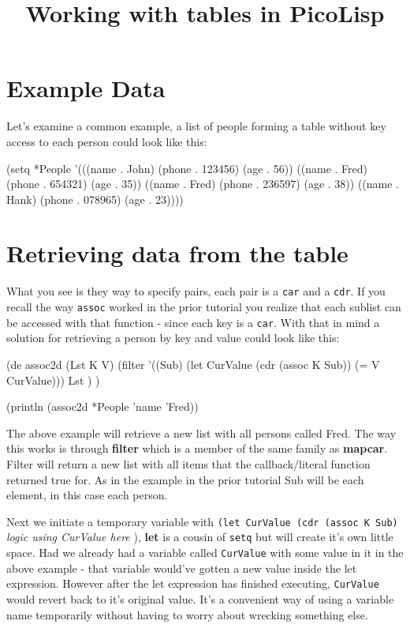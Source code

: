 \title{Working with tables in PicoLisp}

\maketitle

\section{Example Data}
\label{sec:work-with-tables-example-data}

Let's examine a common example, a list of people forming a table without
key access to each person could look like this:

\begin{wideverbatim}
(setq *People 
      '(((name . John) (phone . 123456) (age . 56))
        ((name . Fred) (phone . 654321) (age . 35))
        ((name . Fred) (phone . 236597) (age . 38))
        ((name . Hank) (phone . 078965) (age . 23))))
\end{wideverbatim}


\section{Retrieving data from the table}
\label{sec:work-with-tables-retrieving-data-from-the-table}


What you see is they way to specify pairs, each pair is a \texttt{car}
and a \texttt{cdr}. If you recall the way \texttt{assoc} worked in the
prior tutorial you realize that each sublist can be accessed with that
function - since each key is a \texttt{car}. With that in mind a solution for
retrieving a person by key and value could look like this:


\begin{wideverbatim}
(de assoc2d (Lst K V)
    (filter '((Sub)
              (let CurValue (cdr (assoc K Sub))
                (= V CurValue))) Lst ) )
                
(println (assoc2d *People 'name 'Fred))
\end{wideverbatim}

The above example will retrieve a new list with all persons called Fred.
The way this works is through \textbf{filter} which is a member of the same
family as \textbf{mapcar}. Filter will return a new list with all items that
the callback/literal function returned true for. As in the example in
the prior tutorial Sub will be each element, in this case each person.

Next we initiate a temporary variable with \texttt{(let CurValue (cdr
  (assoc K Sub)} \emph{logic using CurValue here} ), \textbf{let} is a
cousin of \texttt{setq} but will create it's own little space. Had we
already had a variable called \texttt{CurValue} with some value in it in the
above example - that variable would've gotten a new value inside the
let expression. However after the let expression has finished
executing, \texttt{CurValue} would revert back to it's original value. It's a
convenient way of using a variable name temporarily without having to
worry about wrecking something else.

